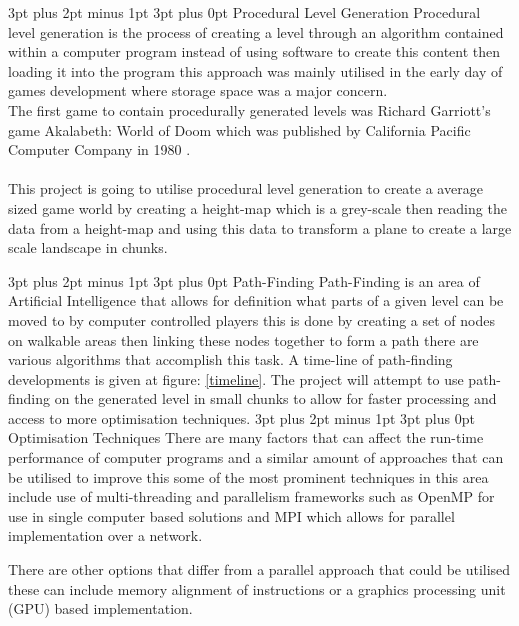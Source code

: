 \documentclass[12pt,a4paper]{article}
\makeatletter
\renewcommand\subsection{\@startsection {subsection}{1}{2mm} %
                               {3pt plus 2pt minus 1pt} %
                               {3pt plus 0pt} %
                               {\normalfont\bfseries}}
\makeatother
\begin{document}
\subsection{Procedural Level Generation}
Procedural level generation is the process of creating a level through an algorithm contained within a computer program instead of using software to create this content then loading it into the program this approach was mainly utilised in the early day of games development where storage space was a major concern.\\The first game to contain procedurally generated levels was Richard Garriott's  game Akalabeth: World of Doom which was published by California Pacific Computer Company in 1980 \cite{Akalabeth}.\\\\This project is going to utilise procedural level generation to create a average sized game world by creating a height-map which is a grey-scale  then reading the data from a height-map and using this data to transform a plane to create a large scale landscape in chunks.

\subsection{Path-Finding}
Path-Finding is an area of Artificial Intelligence that allows for definition what parts of a given level can be moved to by computer controlled players this is done by creating a set of nodes on walkable areas then linking these nodes together to form a path there are various algorithms that accomplish this task. A time-line of path-finding developments is given at figure: \ref{timeline}. The project will attempt to use path-finding on the generated level in small chunks to allow for faster processing and access to more optimisation techniques.  
\subsection{Optimisation Techniques}
There are many factors that can affect the run-time performance of computer programs and a similar amount of approaches that can be utilised to improve this some of the most prominent techniques in this area include use of multi-threading and parallelism frameworks such as OpenMP for use in single computer based solutions and MPI which allows for parallel implementation over a network.

There are other options that differ from a parallel approach that could be utilised these can include memory alignment of instructions or a graphics processing unit (GPU) based implementation.      
\end{document}
